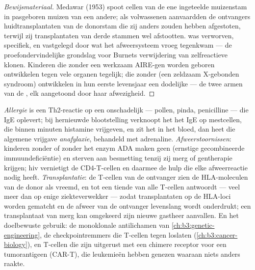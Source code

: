\begin{proof}[Bewijsmateriaal]
Medawar (1953) spoot cellen van de ene ingeteelde muizenstam in
pasgeboren muizen van een andere; als volwassenen aanvaardden de
ontvangers huidtransplantaten van de donorstam die zij anders zouden
hebben afgestoten, terwijl zij transplantaten van derde stammen wel
afstootten.  was verworven, specifiek, en vastgelegd door wat
het afweersysteem vroeg tegenkwam --- de proefondervindelijke grondslag
voor Burnets verwijdering van zelfreactieve klonen. Kinderen die zonder
een werkzaam AIRE-gen worden geboren ontwikkelen  tegen
vele organen tegelijk; die zonder  (een zeldzaam X-gebonden
syndroom) ontwikkelen in hun eerste levensjaar een dodelijke
 --- de twee armen van de , elk aangetoond
door haar afwezigheid.
\end{proof}

\begin{example}\label{ex:b3:adaptive-immunity:failures}
\emph{Allergie} is een Th2-reactie op een onschadelijk  ---
pollen, pinda, penicilline --- die IgE oplevert; bij hernieuwde
blootstelling verknoopt het  het IgE op mestcellen, die binnen
minuten histamine vrijgeven, en zit het  in het bloed, dan heet
die algemene vrijgave \emph{anafylaxie}, behandeld met adrenaline.
\emph{Afweerstoornissen}: kinderen zonder  of zonder het enzym ADA
maken geen  (ernstige gecombineerde immuundeficiëntie) en
sterven aan besmetting tenzij zij merg of gentherapie krijgen; hiv
vernietigt de CD4-T-cellen en daarmee de hulp die elke afweerreactie
nodig heeft. \emph{Transplantatie}: de T-cellen van de ontvanger zien
de HLA-moleculen van de donor als vreemd, en tot een tiende van alle
T-cellen antwoordt --- veel meer dan op enige ziekteverwekker --- zodat
transplantaten op de HLA-loci worden gematcht en de afweer van de
ontvanger levenslang wordt onderdrukt; een transplantaat van merg kan
omgekeerd zijn nieuwe gastheer aanvallen. En het doelbewuste gebruik:
de monoklonale antilichamen van \cref{ch:b3:genetic-engineering}, de
checkpointremmers die T-cellen tegen  loslaten
(\cref{ch:b3:cancer-biology}), en T-cellen die zijn uitgerust met een
chimere receptor voor een tumorantigeen (CAR-T), die leukemieën hebben
genezen waaraan niets anders raakte.
\end{example}

